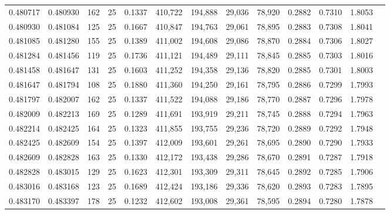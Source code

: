 \begin{tabular}{rrrrrrrrrrrrr}
0.480717 & 0.480930 &   162 &  25 &                                     0.1337 & 410,722 & 194,888 &  29,036 &  78,920 & 0.2882 & 0.7310 & 1.8053 \\
0.480930 & 0.481084 &   125 &  25 &                                     0.1667 & 410,847 & 194,763 &  29,061 &  78,895 & 0.2883 & 0.7308 & 1.8041 \\
0.481085 & 0.481280 &   155 &  25 &                                     0.1389 & 411,002 & 194,608 &  29,086 &  78,870 & 0.2884 & 0.7306 & 1.8027 \\
0.481284 & 0.481456 &   119 &  25 &                                     0.1736 & 411,121 & 194,489 &  29,111 &  78,845 & 0.2885 & 0.7303 & 1.8016 \\
0.481458 & 0.481647 &   131 &  25 &                                     0.1603 & 411,252 & 194,358 &  29,136 &  78,820 & 0.2885 & 0.7301 & 1.8003 \\
0.481647 & 0.481794 &   108 &  25 &                                     0.1880 & 411,360 & 194,250 &  29,161 &  78,795 & 0.2886 & 0.7299 & 1.7993 \\
0.481797 & 0.482007 &   162 &  25 &                                     0.1337 & 411,522 & 194,088 &  29,186 &  78,770 & 0.2887 & 0.7296 & 1.7978 \\
0.482009 & 0.482213 &   169 &  25 &                                     0.1289 & 411,691 & 193,919 &  29,211 &  78,745 & 0.2888 & 0.7294 & 1.7963 \\
0.482214 & 0.482425 &   164 &  25 &                                     0.1323 & 411,855 & 193,755 &  29,236 &  78,720 & 0.2889 & 0.7292 & 1.7948 \\
0.482425 & 0.482609 &   154 &  25 &                                     0.1397 & 412,009 & 193,601 &  29,261 &  78,695 & 0.2890 & 0.7290 & 1.7933 \\
0.482609 & 0.482828 &   163 &  25 &                                     0.1330 & 412,172 & 193,438 &  29,286 &  78,670 & 0.2891 & 0.7287 & 1.7918 \\
0.482828 & 0.483015 &   129 &  25 &                                     0.1623 & 412,301 & 193,309 &  29,311 &  78,645 & 0.2892 & 0.7285 & 1.7906 \\
0.483016 & 0.483168 &   123 &  25 &                                     0.1689 & 412,424 & 193,186 &  29,336 &  78,620 & 0.2893 & 0.7283 & 1.7895 \\
0.483170 & 0.483397 &   178 &  25 &                                     0.1232 & 412,602 & 193,008 &  29,361 &  78,595 & 0.2894 & 0.7280 & 1.7878 \\

\end{tabular}
